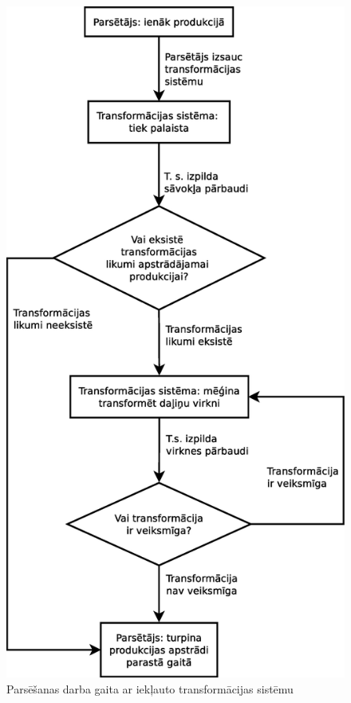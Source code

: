 \begin{figure}[h!]
  \centering
    \includegraphics[scale=0.4]{pictures/match_algorithm}
  \caption{\label{fig:match_algorithm}Parsēšanas darba gaita ar iekļauto transformācijas sistēmu}
\end{figure}